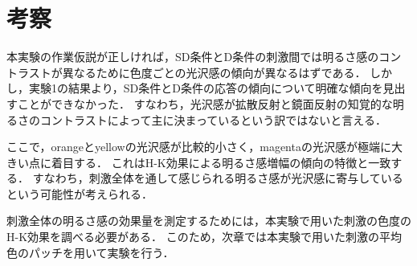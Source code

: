     \section{考察}

        本実験の作業仮説が正しければ，SD条件とD条件の刺激間では明るさ感のコントラストが異なるために色度ごとの光沢感の傾向が異なるはずである．
        しかし，実験1の結果より，SD条件とD条件の応答の傾向について明確な傾向を見出すことができなかった．
        すなわち，光沢感が拡散反射と鏡面反射の知覚的な明るさのコントラストによって主に決まっているという訳ではないと言える．

        ここで，orangeとyellowの光沢感が比較的小さく，magentaの光沢感が極端に大きい点に着目する．
        これはH-K効果による明るさ感増幅の傾向の特徴と一致する．
        すなわち，刺激全体を通して感じられる明るさ感が光沢感に寄与しているという可能性が考えられる．

        刺激全体の明るさ感の効果量を測定するためには，本実験で用いた刺激の色度のH-K効果を調べる必要がある．
        このため，次章では本実験で用いた刺激の平均色のパッチを用いて実験を行う．

    \newpage